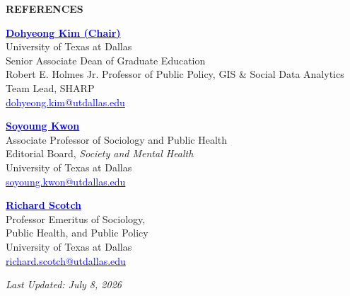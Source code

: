 \documentclass[11pt, letterpaper]{article}
\begin{document}
\vspace{1em}
\noindent\hrulefill
\begin{center}
    \textbf{REFERENCES}
\end{center}

\begin{minipage}[t]{0.48\textwidth}
    \raggedright
    \textbf{\href{https://profiles.utdallas.edu/dohyeong.kim}{\textcolor{blue}{Dohyeong Kim (Chair)}}} \\
    University of Texas at Dallas \\
    Senior Associate Dean of Graduate Education \\
    Robert E. Holmes Jr. Professor of Public Policy, GIS \& Social Data Analytics \\
    Team Lead, SHARP \\
    \href{mailto:dohyeong.kim@utdallas.edu}{\textcolor{blue}{dohyeong.kim@utdallas.edu}}
\end{minipage}
\hfill
\begin{minipage}[t]{0.48\textwidth}
    \raggedright
    \textbf{\href{https://profiles.utdallas.edu/soyoung.kwon}{\textcolor{blue}{Soyoung Kwon}}} \\
    Associate Professor of Sociology and Public Health \\
    Editorial Board, \textit{Society and Mental Health} \\
    University of Texas at Dallas \\
    \href{mailto:soyoung.kwon@utdallas.edu}{\textcolor{blue}{soyoung.kwon@utdallas.edu}}
\end{minipage}

\vspace{1.5em}

\begin{minipage}[t]{0.48\textwidth}
    \raggedright
    \textbf{\href{https://profiles.utdallas.edu/richard.scotch}{\textcolor{blue}{Richard Scotch}}} \\
    Professor Emeritus of Sociology, \\
    Public Health, and Public Policy \\
    University of Texas at Dallas \\
    \href{mailto:richard.scotch@utdallas.edu}{\textcolor{blue}{richard.scotch@utdallas.edu}}
\end{minipage}

\vspace{1em}
\begin{center}
    \textit{Last Updated: July 8, 2026}
\end{center}
\end{document}
